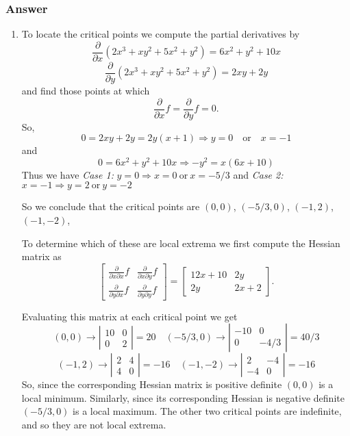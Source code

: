 \documentclass[12pt]{article}
\begin{document}
\subsubsection{Answer}
\begin{enumerate}
\item To locate the critical points we compute the partial derivatives by
\[\frac{\partial}{\partial x} \left( 2x^3+ x y ^2+5x^2+y^2\right) =  6x^2 +y^2+10 x\]
\[\frac{\partial}{\partial y} \left( 2x^3+ x y ^2+5x^2+y^2\right) =  2xy+2y\]
and find those points at which
\[\frac{\partial}{\partial x} f = \frac{\partial}{\partial y} f = 0.\]
So,
\[0=2xy+2y= 2y(x+1)\Rightarrow y=0 \quad \mathrm{or} \quad x=-1\]
and
\[0=6x^2 +y^2+10 x \Rightarrow -y^2 = x(6x+10)\]
Thus we have 
\emph{Case 1: }$y=0 \Rightarrow x=0 \mathrm{\ or\ } x= -5/3$ and \emph{Case 2: }$x=-1 \Rightarrow y=2 \mathrm{\ or\ } y=-2$


So we conclude that the critical points are $(0,0)$, $(-5/3,0)$, $(-1,2)$, $(-1,-2)$, 

To determine which of these are local extrema we first compute the Hessian matrix as 
\[
\left[
\begin{array}{lr}
\frac{\partial}{\partial x \partial x} f&\frac{\partial}{\partial x \partial y} f\\
\frac{\partial}{\partial y \partial x} f&\frac{\partial}{\partial y \partial y} f
\end{array}\right]
=
\left[
\begin{array}{lr}
12 x +10 & 2y\\
2y & 2x+2
\end{array}\right].
\]

Evaluating this matrix at each critical point we get 
\[(0,0)\to\left|
\begin{array}{lr}
10 & 0\\
0 & 2
\end{array}\right|=20
\quad
(-5/3,0)
\to
\left|
\begin{array}{lr}
-10 & 0\\
0 & -4/3
\end{array}\right|=40/3
\]
\[
(-1,2)
\to
\left|
\begin{array}{lr}
2  & 4\\
4 & 0
\end{array}\right|=-16
\quad
(-1,-2)
\to
\left|
\begin{array}{lr}
2  & -4\\
-4 & 0
\end{array}\right|=-16
\]
So, since the corresponding Hessian matrix is positive definite $(0,0)$ is a local minimum. Similarly, since its corresponding Hessian is negative definite $(-5/3,0)$ is a local maximum. The other two critical points are indefinite, and so they are not local extrema. 


\end{enumerate}
\end{document}

